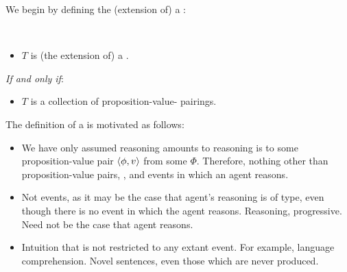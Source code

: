 \begin{note}
  We begin by defining the (extension of) a \tor{}:

  \begin{definition}[\tor{2}]
    \label{def:tor}
    \mbox{ }
    \vspace{-\baselineskip}
    \begin{itemize}
    \item
      \(T\) is (the extension of) a \emph{}.
    \end{itemize}

    \emph{If and only if}:

    \begin{itemize}
    \item
      \(T\) is a collection of proposition-value-\pool{} pairings.
    \end{itemize}
    \vspace{-\baselineskip}
  \end{definition}

  The definition of a \tor{} is motivated as follows:
  \begin{itemize}
  \item
    We have only assumed reasoning amounts to reasoning is to some proposition-value pair \(\langle \phi, v \rangle\) from some \pool{} \(\Phi\).
    Therefore, nothing other than proposition-value pairs, , and events in which an agent reasons.
  \item
    Not events, as it may be the case that agent's reasoning is of type, even though there is no event in which the agent reasons.
    Reasoning, progressive.
    Need not be the case that agent reasons.
  \item
    Intuition that \tor{} is not restricted to any extant event.
    For example, language comprehension.
    Novel sentences, even those which are never produced.
  \end{itemize}
\end{note}

